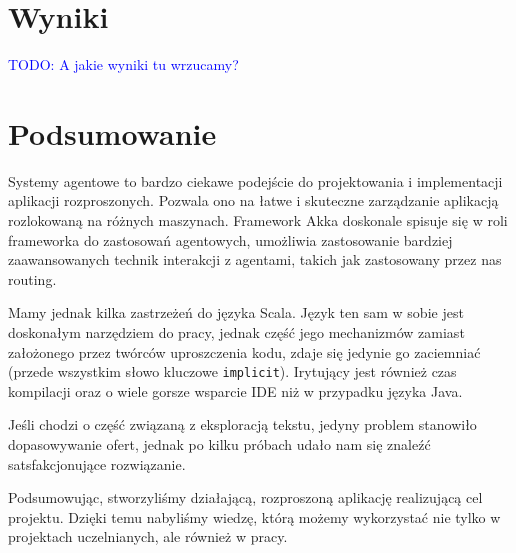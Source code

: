 \documentclass[a4paper,12pt]{mwart}
\newcommand{\TODO}[1]{\textcolor{blue}{TODO: #1 \\}}
\begin{document}
\section{Wyniki}
\TODO{A jakie wyniki tu wrzucamy?}

\section{Podsumowanie}
Systemy agentowe to bardzo ciekawe podejście do projektowania i implementacji
aplikacji rozproszonych. Pozwala ono na łatwe i skuteczne zarządzanie aplikacją
rozlokowaną na różnych maszynach. Framework Akka doskonale spisuje się w roli
frameworka do zastosowań agentowych, umożliwia zastosowanie bardziej
zaawansowanych technik interakcji z agentami, takich jak zastosowany przez nas
routing.

Mamy jednak kilka zastrzeżeń do języka Scala. Język ten sam w sobie
jest doskonałym narzędziem do pracy, jednak część jego mechanizmów zamiast
założonego przez twórców uproszczenia kodu, zdaje się jedynie go zaciemniać
(przede wszystkim słowo kluczowe \verb+implicit+).
Irytujący jest również czas kompilacji oraz o wiele gorsze wsparcie IDE niż
w przypadku języka Java.

Jeśli chodzi o część związaną z eksploracją tekstu, jedyny problem stanowiło
dopasowywanie ofert, jednak po kilku próbach udało nam się znaleźć
satsfakcjonujące rozwiązanie.

Podsumowując, stworzyliśmy działającą, rozproszoną aplikację
realizującą cel projektu. Dzięki temu nabyliśmy wiedzę, którą możemy wykorzystać
nie tylko w projektach uczelnianych, ale również w pracy.
\end{document}
